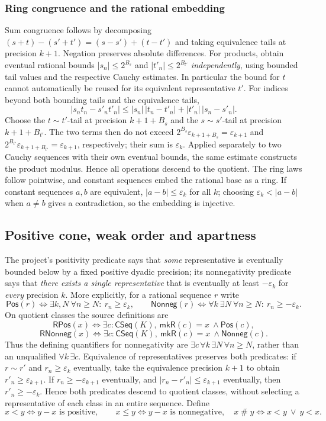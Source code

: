 \documentclass[11pt,reqno]{amsart}
\theoremstyle{definition}\newtheorem{definition}[theorem]{Definition}
\theoremstyle{remark}\newtheorem{remark}[theorem]{Remark}
\newcommand{\eps}{\varepsilon}
\newcommand{\Apt}{\mathrel{\#}}
\begin{document}
\medskip
\subsubsection*{Ring congruence and the rational embedding}\label{supp:12-4}
Sum congruence follows by decomposing $(s+t)-(s'+t')=(s-s')+(t-t')$ and taking equivalence tails at precision $k+1$. Negation preserves absolute differences. For products, obtain eventual rational bounds $|s_n|\le 2^{B_s}$ and $|t'_n|\le2^{B_{t'}}$ \emph{independently}, using bounded tail values and the respective Cauchy estimates. In particular the bound for $t$ cannot automatically be reused for its equivalent representative $t'$. For indices beyond both bounding tails and the equivalence tails,
\[
|s_nt_n-s'_nt'_n|\le |s_n|\,|t_n-t'_n|+|t'_n|\,|s_n-s'_n|.
\]
Choose the $t\sim t'$-tail at precision $k+1+B_s$ and the $s\sim s'$-tail at precision $k+1+B_{t'}$. The two terms then do not exceed $2^{B_s}\eps_{k+1+B_s}=\eps_{k+1}$ and $2^{B_{t'}}\eps_{k+1+B_{t'}}=\eps_{k+1}$, respectively; their sum is $\eps_k$. Applied separately to two Cauchy sequences with their own eventual bounds, the same estimate constructs the product modulus. Hence all operations descend to the quotient. The ring laws follow pointwise, and constant sequences embed the rational base as a ring. If constant sequences $a,b$ are equivalent, $|a-b|\le\eps_k$ for all $k$; choosing $\eps_k<|a-b|$ when $a\ne b$ gives a contradiction, so the embedding is injective.
\medskip

\subsection{Positive cone, weak order and apartness}\label{main:sub-43}
The project's positivity predicate says that \emph{some} representative is eventually bounded below by a fixed positive dyadic precision; its nonnegativity predicate says that \emph{there exists a single representative} that is eventually at least $-\eps_k$ for \emph{every} precision $k$. More explicitly, for a rational sequence $r$ write
\[
\mathsf{Pos}(r)\iff\exists k,N\ \forall n\ge N:\ r_n\ge\eps_k,
\qquad
\mathsf{Nonneg}(r)\iff\forall k\ \exists N\ \forall n\ge N:\ r_n\ge-\eps_k.
\]
On quotient classes the source definitions are
\[
 \mathsf{RPos}(x)\iff\exists c:\mathsf{CSeq}(K),\ \mathsf{mkR}(c)=x\ \land\mathsf{Pos}(c),
\]
\[
 \mathsf{RNonneg}(x)\iff\exists c:\mathsf{CSeq}(K),\ \mathsf{mkR}(c)=x\ \land\mathsf{Nonneg}(c).
\]
Thus the defining quantifiers for nonnegativity are $\exists c\,\forall k\,\exists N\,\forall n\ge N$, rather than an unqualified $\forall k\,\exists c$. Equivalence of representatives preserves both predicates: if $r\sim r'$ and $r_n\ge\eps_k$ eventually, take the equivalence precision $k+1$ to obtain $r'_n\ge\eps_{k+1}$. If $r_n\ge-\eps_{k+1}$ eventually, and $|r_n-r'_n|\le\eps_{k+1}$ eventually, then $r'_n\ge-\eps_k$. Hence both predicates descend to quotient classes, without selecting a representative of each class in an entire sequence. Define
\[
x<y\Longleftrightarrow y-x\text{ is positive},\qquad
x\le y\Longleftrightarrow y-x\text{ is nonnegative},
\quad x\Apt y\Longleftrightarrow x<y\ \lor\ y<x.
\]
\end{document}
